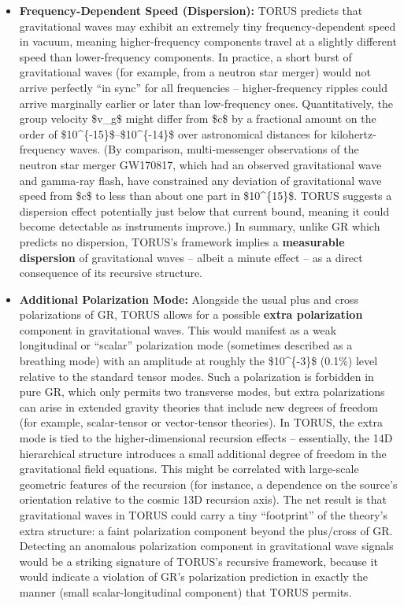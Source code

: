 \begin{itemize}
\item
  \textbf{Frequency-Dependent Speed (Dispersion):} TORUS predicts that
  gravitational waves may exhibit an extremely tiny frequency-dependent
  speed in vacuum, meaning higher-frequency components travel at a
  slightly different speed than lower-frequency components​. In
  practice, a short burst of gravitational waves (for example, from a
  neutron star merger) would not arrive perfectly ``in sync'' for all
  frequencies -- higher-frequency ripples could arrive marginally
  earlier or later than low-frequency ones. Quantitatively, the group
  velocity \$v\_g\$ might differ from \$c\$ by a fractional amount on
  the order of \$10\^{}\{-15\}\$--\$10\^{}\{-14\}\$ over astronomical
  distances for kilohertz-frequency waves​. (By comparison,
  multi-messenger observations of the neutron star merger GW170817,
  which had an observed gravitational wave and gamma-ray flash, have
  constrained any deviation of gravitational wave speed from \$c\$ to
  less than about one part in \$10\^{}\{15\}\$​. TORUS suggests a
  dispersion effect potentially just below that current bound, meaning
  it could become detectable as instruments improve.) In summary, unlike
  GR which predicts no dispersion, TORUS's framework implies a
  \textbf{measurable dispersion} of gravitational waves -- albeit a
  minute effect -- as a direct consequence of its recursive structure.
\item
  \textbf{Additional Polarization Mode:} Alongside the usual plus and
  cross polarizations of GR, TORUS allows for a possible \textbf{extra
  polarization} component in gravitational waves​. This would manifest
  as a weak longitudinal or ``scalar'' polarization mode (sometimes
  described as a breathing mode) with an amplitude at roughly the
  \$10\^{}\{-3\}\$ (0.1\%) level relative to the standard tensor modes​.
  Such a polarization is forbidden in pure GR, which only permits two
  transverse modes, but extra polarizations can arise in extended
  gravity theories that include new degrees of freedom (for example,
  scalar-tensor or vector-tensor theories). In TORUS, the extra mode is
  tied to the higher-dimensional recursion effects -- essentially, the
  14D hierarchical structure introduces a small additional degree of
  freedom in the gravitational field equations. This might be correlated
  with large-scale geometric features of the recursion (for instance, a
  dependence on the source's orientation relative to the cosmic 13D
  recursion axis)​. The net result is that gravitational waves in TORUS
  could carry a tiny ``footprint'' of the theory's extra structure: a
  faint polarization component beyond the plus/cross of GR. Detecting an
  anomalous polarization component in gravitational wave signals would
  be a striking signature of TORUS's recursive framework, because it
  would indicate a violation of GR's polarization prediction in exactly
  the manner (small scalar-longitudinal component) that TORUS permits​.
\end{itemize}

